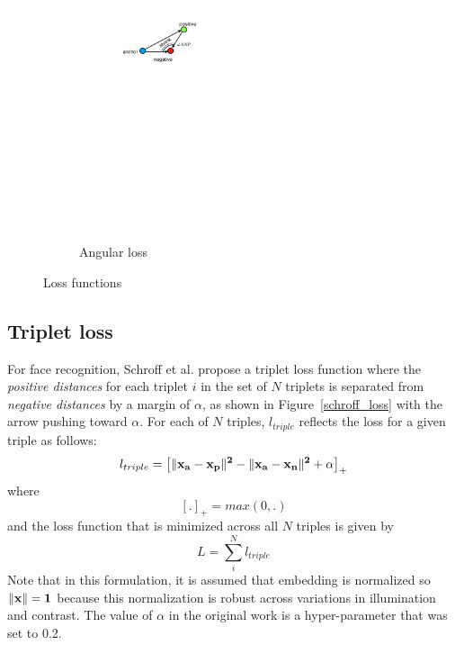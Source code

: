 \begin{figure}[htb]
\begin{subfigure}[t]{0.3\linewidth}
        \includegraphics[width=\linewidth]{angular_loss}
        \caption{Angular loss}
        \label{angular_loss}
    \end{subfigure}
    \caption{Loss functions}
\end{figure}

\subsection{Triplet loss}

For face recognition, Schroff et al. \cite{DBLP:conf/cvpr/SchroffKP15}
propose a triplet loss function where the \textit{positive distances}
for each triplet $i$ in the set of $N$ triplets is separated from
\textit{negative distances} by a margin of $\alpha$, as shown in
Figure~\ref{schroff_loss} with the arrow pushing toward $\alpha$.  For
each of $N$ triples, $l_{triple}$ reflects the loss for a given triple
as follows: 
\begin{equation}
  l_{triple} =  \left[\|\bf{x_a} - \bf{x_p}\|^2 - \|\bf{x_a} -\bf{x_n}\|^2 + \alpha \right]_+
\label{schroff}
\end{equation}
where
\begin{equation}
 \left[.\right]_{+} = max(0, .)
\end{equation}
and the loss function that is minimized across all $N$ triples is given by
\begin{equation}
 L = \sum_{i}^{N} l_{triple}
\end{equation}
Note that in this formulation, it is assumed that embedding is normalized so $\|\bf{x} \| = 1$ because this normalization is robust across variations in illumination and contrast.  The value of $\alpha$ in the original work is a hyper-parameter that \cite{DBLP:conf/cvpr/SchroffKP15} was set to 0.2.

